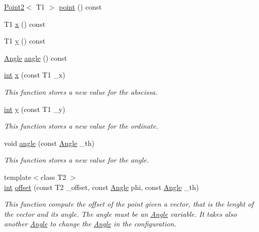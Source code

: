 \begin{DoxyCompactItemize}
\mbox{\hyperlink{class_point2}{Point2}}$<$ T1 $>$ \mbox{\hyperlink{class_configuration2_a15ce37ad4eae9f4a980fc3578765984d}{point}} () const
\item 
T1 \mbox{\hyperlink{class_configuration2_a430b4b412cbdad376feec03c52bde56f}{x}} () const
\item 
T1 \mbox{\hyperlink{class_configuration2_a6f92f5478bb05304dae587203c8de9c1}{y}} () const
\item 
\mbox{\hyperlink{class_angle}{Angle}} \mbox{\hyperlink{class_configuration2_a00f073b1127aa9bf9e7a06a833a47555}{angle}} () const
\item 
\mbox{\hyperlink{draw_8hh_aa620a13339ac3a1177c86edc549fda9b}{int}} \mbox{\hyperlink{class_configuration2_ac8b1ca22acbfd0c59d145eb3ac42f39d}{x}} (const T1 \+\_\+x)
\begin{DoxyCompactList}\small\item\em This function stores a new value for the abscissa. \end{DoxyCompactList}\item 
\mbox{\hyperlink{draw_8hh_aa620a13339ac3a1177c86edc549fda9b}{int}} \mbox{\hyperlink{class_configuration2_a6cc23545dd1c7d17aa32c96126f1f727}{y}} (const T1 \+\_\+y)
\begin{DoxyCompactList}\small\item\em This function stores a new value for the ordinate. \end{DoxyCompactList}\item 
void \mbox{\hyperlink{class_configuration2_a8ff42470c34aaa1885df5974e8b7896d}{angle}} (const \mbox{\hyperlink{class_angle}{Angle}} \+\_\+th)
\begin{DoxyCompactList}\small\item\em This function stores a new value for the angle. \end{DoxyCompactList}\item 
{\footnotesize template$<$class T2 $>$ }\\\mbox{\hyperlink{draw_8hh_aa620a13339ac3a1177c86edc549fda9b}{int}} \mbox{\hyperlink{class_configuration2_a4c3bb49ce67ceb4b1b492cb7c093ea8c}{offset}} (const T2 \+\_\+offset, const \mbox{\hyperlink{class_angle}{Angle}} phi, const \mbox{\hyperlink{class_angle}{Angle}} \+\_\+th)
\begin{DoxyCompactList}\small\item\em This function compute the offset of the point given a vector, that is the lenght of the vector and its angle. The angle must be an {\ttfamily \mbox{\hyperlink{class_angle}{Angle}}} variable. It takes also another {\ttfamily \mbox{\hyperlink{class_angle}{Angle}}} to change the {\ttfamily \mbox{\hyperlink{class_angle}{Angle}}} in the configuration. \end{DoxyCompactList}\item 

\end{DoxyCompactItemize}
